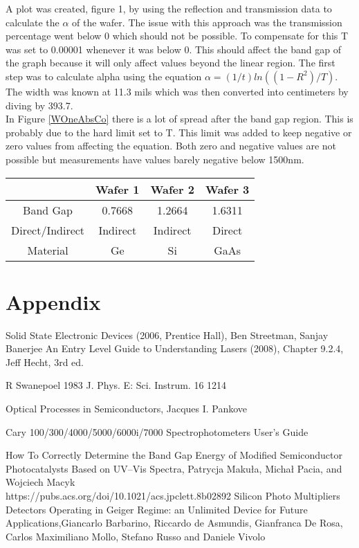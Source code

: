 \documentclass[10pt,a4paper]{article}
\begin{document}
\begin{multicols}{2}
    
    
A plot was created, figure 1, by using the reflection and transmission data to calculate the $\alpha$ of the wafer. The issue with this approach was the transmission percentage went below 0 which should not be possible. To compensate for this T was set to 0.00001 whenever it was below 0. This should affect the band gap of the graph because it will only affect values beyond the linear region. The first step was to calculate alpha using the equation $ \alpha = (1/t)ln((1-R^2)/T)$. The width was known at 11.3 mils which was then converted into centimeters by diving by 393.7.
\\

     
     In Figure \ref{WOneAbsCo} there is a lot of spread after the band gap region. This is probably due to the hard limit set to T. This limit was added to keep negative or zero values from affecting the equation. Both zero and negative values are not possible but measurements have values barely negative below 1500nm. 



\centering
\begin{tabular}{ |c|c|c|c| } 
 \hline
  & Wafer 1 & Wafer 2 & Wafer 3 \\
   \hline
 Band Gap & 0.7668 & 1.2664  & 1.6311 \\ 
 Direct/Indirect & Indirect & Indirect & Direct \\
 Material & Ge & Si & GaAs \\
 \hline
\end{tabular}
    

\section*{Appendix}

\begin{thebibliography}{9}
 Solid State Electronic Devices (2006, Prentice Hall), Ben Streetman, Sanjay Banerjee
An Entry Level Guide to Understanding Lasers (2008), Chapter 9.2.4, Jeff Hecht, 3rd ed. 

R Swanepoel 1983 J. Phys. E: Sci. Instrum. 16 1214

Optical Processes in Semiconductors, Jacques I. Pankove

Cary 100/300/4000/5000/6000i/7000 Spectrophotometers User's Guide

How To Correctly Determine the Band Gap Energy of Modified Semiconductor Photocatalysts Based on UV–Vis Spectra, Patrycja Makuła, Michał Pacia, and Wojciech Macyk\\https://pubs.acs.org/doi/10.1021/acs.jpclett.8b02892
Silicon Photo Multipliers Detectors Operating in Geiger Regime: an Unlimited Device for Future Applications,Giancarlo Barbarino, Riccardo de Asmundis, Gianfranca De Rosa, Carlos Maximiliano Mollo, Stefano Russo and Daniele Vivolo
\end{thebibliography}

\end{multicols}
\end{document}
